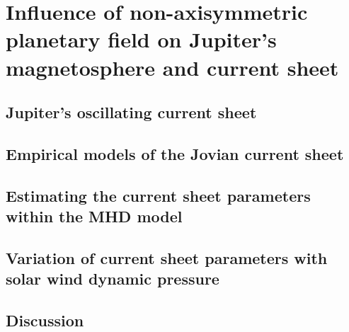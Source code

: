 \chapter{Influence of non-axisymmetric planetary field on Jupiter's magnetosphere and current sheet}

\section{Jupiter's oscillating current sheet}
\section{Empirical models of the Jovian current sheet}
\section{Estimating the current sheet parameters within the MHD model}
\section{Variation of current sheet parameters with solar wind dynamic pressure}
\section{Discussion}